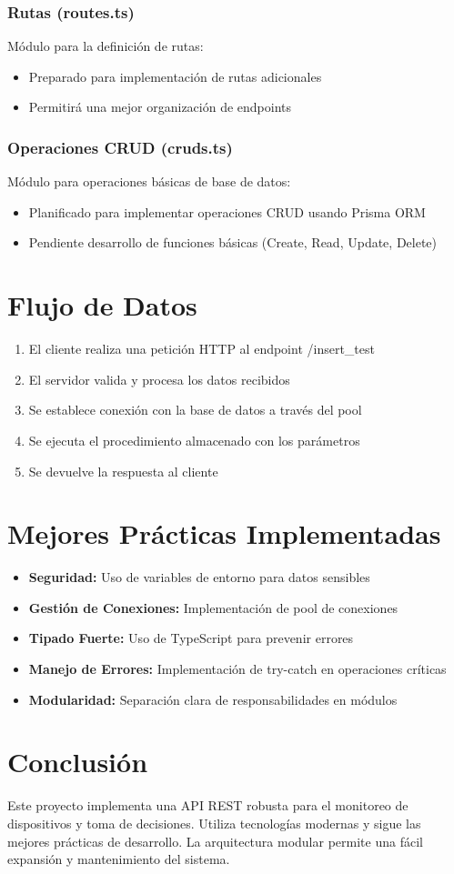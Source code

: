 \documentclass{article}
\begin{document}
\subsubsection{Rutas (routes.ts)}
Módulo para la definición de rutas:
\begin{itemize}
    \item Preparado para implementación de rutas adicionales
    \item Permitirá una mejor organización de endpoints
\end{itemize}

\subsubsection{Operaciones CRUD (cruds.ts)}
Módulo para operaciones básicas de base de datos:
\begin{itemize}
    \item Planificado para implementar operaciones CRUD usando Prisma ORM
    \item Pendiente desarrollo de funciones básicas (Create, Read, Update, Delete)
\end{itemize}

\section{Flujo de Datos}
\begin{enumerate}
    \item El cliente realiza una petición HTTP al endpoint /insert\_test
    \item El servidor valida y procesa los datos recibidos
    \item Se establece conexión con la base de datos a través del pool
    \item Se ejecuta el procedimiento almacenado con los parámetros
    \item Se devuelve la respuesta al cliente
\end{enumerate}

\section{Mejores Prácticas Implementadas}
\begin{itemize}
    \item \textbf{Seguridad:} Uso de variables de entorno para datos sensibles
    \item \textbf{Gestión de Conexiones:} Implementación de pool de conexiones
    \item \textbf{Tipado Fuerte:} Uso de TypeScript para prevenir errores
    \item \textbf{Manejo de Errores:} Implementación de try-catch en operaciones críticas
    \item \textbf{Modularidad:} Separación clara de responsabilidades en módulos
\end{itemize}

\section{Conclusión}
Este proyecto implementa una API REST robusta para el monitoreo de dispositivos y toma de decisiones. Utiliza tecnologías modernas y sigue las mejores prácticas de desarrollo. La arquitectura modular permite una fácil expansión y mantenimiento del sistema.
\end{document}
